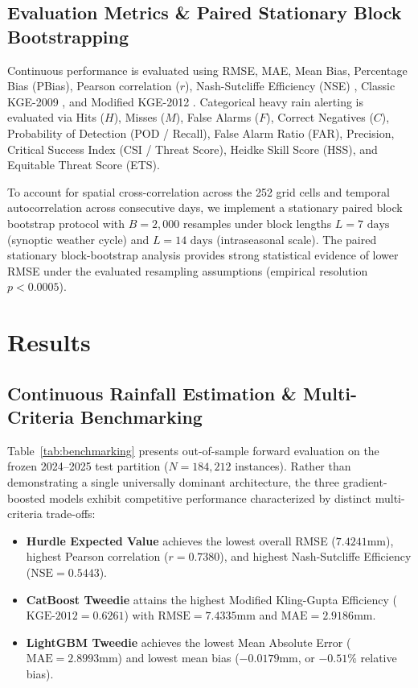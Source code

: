 \documentclass[pdflatex,sn-mathphys,Numbered]{sn-jnl}
\begin{document}
\subsection{Evaluation Metrics \& Paired Stationary Block Bootstrapping}
Continuous performance is evaluated using RMSE, MAE, Mean Bias, Percentage Bias (PBias), Pearson correlation ($r$), Nash-Sutcliffe Efficiency (NSE) \cite{nash1970}, Classic KGE-2009 \cite{gupta2009}, and Modified KGE-2012 \cite{kling2012}. Categorical heavy rain alerting is evaluated via Hits ($H$), Misses ($M$), False Alarms ($F$), Correct Negatives ($C$), Probability of Detection (POD / Recall), False Alarm Ratio (FAR), Precision, Critical Success Index (CSI / Threat Score), Heidke Skill Score (HSS), and Equitable Threat Score (ETS).

To account for spatial cross-correlation across the 252 grid cells and temporal autocorrelation across consecutive days, we implement a stationary paired block bootstrap protocol \cite{kunsch1989, politis1994} with $B = 2,000$ resamples under block lengths $L = 7\text{ days}$ (synoptic weather cycle) and $L = 14\text{ days}$ (intraseasonal scale). The paired stationary block-bootstrap analysis provides strong statistical evidence of lower RMSE under the evaluated resampling assumptions (empirical resolution $p < 0.0005$).

\section{Results}\label{sec4}

\subsection{Continuous Rainfall Estimation \& Multi-Criteria Benchmarking}
Table~\ref{tab:benchmarking} presents out-of-sample forward evaluation on the frozen 2024--2025 test partition ($N = 184,212$ instances). Rather than demonstrating a single universally dominant architecture, the three gradient-boosted models exhibit competitive performance characterized by distinct multi-criteria trade-offs:
\begin{itemize}
    \item \textbf{Hurdle Expected Value} achieves the lowest overall RMSE ($7.4241$\;mm), highest Pearson correlation ($r = 0.7380$), and highest Nash-Sutcliffe Efficiency ($\text{NSE} = 0.5443$).
    \item \textbf{CatBoost Tweedie} attains the highest Modified Kling-Gupta Efficiency ($\text{KGE-2012} = 0.6261$) with $\text{RMSE} = 7.4335$\;mm and $\text{MAE} = 2.9186$\;mm.
    \item \textbf{LightGBM Tweedie} achieves the lowest Mean Absolute Error ($\text{MAE} = 2.8993$\;mm) and lowest mean bias ($-0.0179$\;mm, or $-0.51\%$ relative bias).
\end{itemize}
\end{document}

